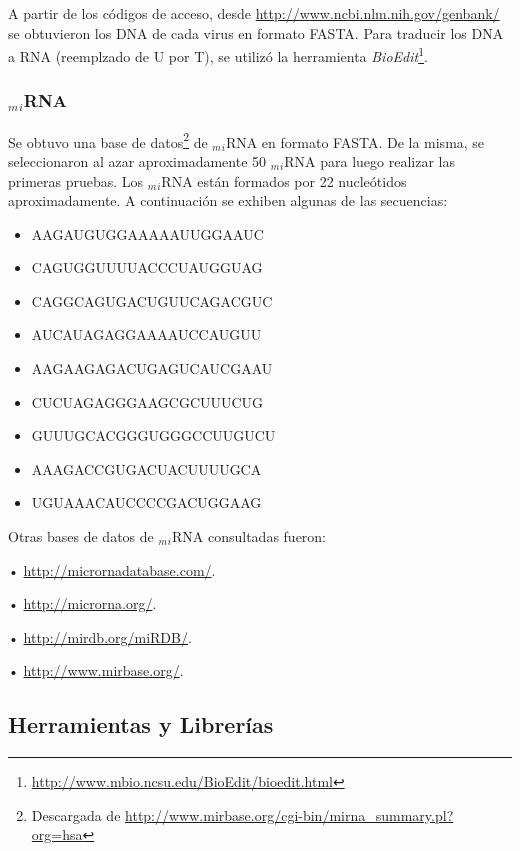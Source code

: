 	\par A partir de los códigos de acceso, desde \url{http://www.ncbi.nlm.nih.gov/genbank/} se obtuvieron los DNA de cada virus en formato FASTA. Para traducir los DNA a RNA (reemplzado de \textsc{U} por \textsc{T}), se utilizó la herramienta \emph{BioEdit}\footnote{\url{http://www.mbio.ncsu.edu/BioEdit/bioedit.html}}. 

\subsubsection{$_m$$_i$RNA}
	\par Se obtuvo una base de datos\footnote{Descargada de \url{http://www.mirbase.org/cgi-bin/mirna\_summary.pl?org=hsa}} de $_m$$_i$RNA en formato FASTA. De la misma, se seleccionaron al azar aproximadamente 50 $_m$$_i$RNA para luego realizar las primeras pruebas. Los $_m$$_i$RNA están formados por 22 nucleótidos aproximadamente. A continuación se exhiben algunas de las secuencias: 
\begin{itemize}
	\item \textsc{AAGAUGUGGAAAAAUUGGAAUC}
	\item \textsc{CAGUGGUUUUACCCUAUGGUAG}
	\item \textsc{CAGGCAGUGACUGUUCAGACGUC}
	\item \textsc{AUCAUAGAGGAAAAUCCAUGUU}
	\item \textsc{AAGAAGAGACUGAGUCAUCGAAU}
	\item \textsc{CUCUAGAGGGAAGCGCUUUCUG}
	\item \textsc{GUUUGCACGGGUGGGCCUUGUCU}
	\item \textsc{AAAGACCGUGACUACUUUUGCA}
	\item \textsc{UGUAAACAUCCCCGACUGGAAG}
\end{itemize}
		
	\par Otras bases de datos de $_m$$_i$RNA consultadas fueron: 
		\par \hspace*{1cm} • \url{http://micrornadatabase.com/}.
		\par \hspace*{1cm} • \url{http://microrna.org/}.
		\par \hspace*{1cm} • \url{http://mirdb.org/miRDB/}.
		\par \hspace*{1cm} • \url{http://www.mirbase.org/}.

\subsection{Herramientas y Librerías}
